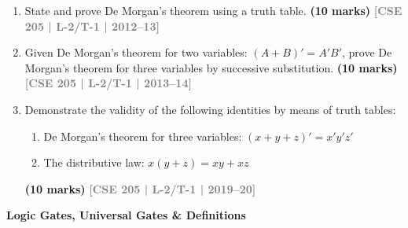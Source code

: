 \documentclass[12pt,a4paper]{article}
\newcommand{\yr}[1]{\hfill\textcolor{gray}{\small\textbf{[#1]}}}
\newcommand{\mk}[1]{\textcolor{orange!70!black}{\small\textbf{(#1 marks)}}}
\newcommand{\subtopic}[2]{%
  \vspace{10pt}
  \noindent\begin{tcolorbox}[colback=#1!8,colframe=#1,boxrule=0.6pt,arc=4pt,
    left=6pt,right=6pt,top=4pt,bottom=4pt]
    \small\bfseries\textcolor{#1}{#2}
  \end{tcolorbox}
  \vspace{2pt}
}
\begin{document}
\begin{enumerate}

\item State and prove De Morgan's theorem using a truth table.
\mk{10} \yr{CSE 205 | L-2/T-1 | 2012--13}

\item Given De Morgan's theorem for two variables: $(A + B)' = A'B'$, prove De Morgan's theorem for three variables by successive substitution.
\mk{10} \yr{CSE 205 | L-2/T-1 | 2013--14}


\item Demonstrate the validity of the following identities by means of truth tables:
\begin{enumerate}
  \item De Morgan's theorem for three variables: $(x + y + z)' = x'y'z'$
  \item The distributive law: $x(y + z) = xy + xz$
\end{enumerate}
\mk{10} \yr{CSE 205 | L-2/T-1 | 2019--20}

\end{enumerate}

\subtopic{cA}{Logic Gates, Universal Gates \& Definitions}
\label{sub:s1-logic-gates}
\end{document}
